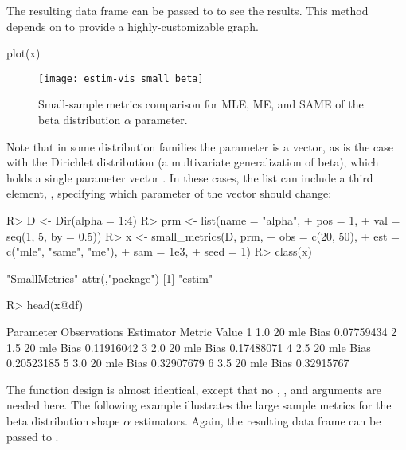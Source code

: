 \documentclass[nojss]{jss}
\newcommand{\fct}[1]{\code{#1()}}
\begin{document}
The resulting data frame can be passed to \fct{plot} to see the results. This \fct{plot} method depends on  to provide a highly-customizable graph.

\begin{CodeChunk}
\begin{CodeInput}
plot(x)
\end{CodeInput}
\end{CodeChunk}

\begin{figure}[t!]
\centering
\texttt{[image: estim-vis\_small\_beta]}
  \caption{\label{fig:vis-small-beta} Small-sample metrics comparison for MLE, ME, and SAME of the beta distribution $\alpha$ parameter.}
\end{figure}

Note that in some distribution families the parameter is a vector, as is the case with the Dirichlet distribution (a multivariate generalization of beta), which holds a single parameter vector . In these cases, the  list can include a third element, , specifying which parameter of the vector should change:

\begin{Schunk}
\begin{Sinput}
R> D <- Dir(alpha = 1:4)
R> prm <- list(name = "alpha",
+              pos = 1,
+              val = seq(1, 5, by = 0.5))
R> x <- small_metrics(D, prm,
+                     obs = c(20, 50),
+                     est = c("mle", "same", "me"),
+                     sam = 1e3,
+                     seed = 1)
R> class(x)
\end{Sinput}
\begin{Soutput}
[1] "SmallMetrics"
attr(,"package")
[1] "estim"
\end{Soutput}
\begin{Sinput}
R> head(x@df)
\end{Sinput}
\begin{Soutput}
  Parameter Observations Estimator Metric      Value
1       1.0           20       mle   Bias 0.07759434
2       1.5           20       mle   Bias 0.11916042
3       2.0           20       mle   Bias 0.17488071
4       2.5           20       mle   Bias 0.20523185
5       3.0           20       mle   Bias 0.32907679
6       3.5           20       mle   Bias 0.32915767
\end{Soutput}
\end{Schunk}

The \fct{large\_metrics} function design is almost identical, except that no , , and  arguments are needed here. The following example illustrates the large sample metrics for the beta distribution shape $\alpha$ estimators. Again, the resulting data frame can be passed to \fct{plot}.
\end{document}
